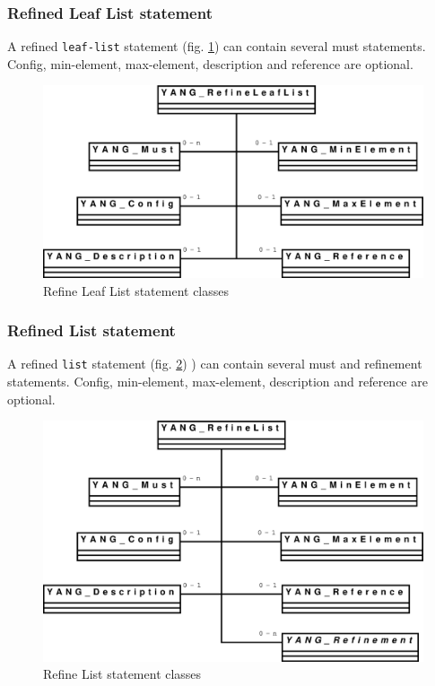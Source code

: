 \documentclass[a4paper]{article}
\begin{document}
\subsubsection{Refined Leaf List statement}

A  refined {\tt leaf-list}  statement (fig.  \ref{refineleaflist}) can
contain  several must  statements.  Config, min-element,  max-element,
description and reference are optional.
\begin{figure}[htbp]
\begin{center}
\includegraphics[scale = .3]{refineleaflist.eps}
\end{center}
\caption{Refine Leaf List statement classes}
\label{refineleaflist}
\end{figure}

\subsubsection{Refined List statement}

A refined  {\tt list} statement (fig. \ref{refinelist})  ) can contain
several   must  and   refinement  statements.    Config,  min-element,
max-element, description and reference are optional.
\begin{figure}[htbp]
\begin{center}
\includegraphics[scale = .3]{refinelist.eps}
\end{center}
\caption{Refine List statement classes}
\label{refinelist}
\end{figure}
\end{document}
